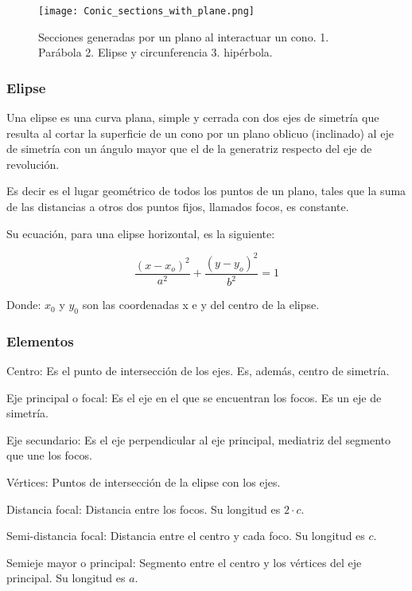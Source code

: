     \begin{figure}[htb]
 		\centering
		\texttt{[image: Conic\_sections\_with\_plane.png]}
        \caption{Secciones generadas por un plano al interactuar un cono.
        \vspace*{0.5cm}
        1. Parábola 2. Elipse y circunferencia 3. hipérbola.}
		\label{secciones}
	\end{figure}


    \subsubsection*{Elipse} \label{Elipse}


    Una elipse es una curva plana, simple y cerrada con dos ejes de
    simetría que resulta al cortar la superficie de un cono por un plano
    oblicuo (inclinado) al eje de simetría con un ángulo mayor que el de la
    generatriz respecto del eje de revolución.

    Es decir es el lugar geométrico de todos los puntos de un plano, tales que
    la suma de las distancias a otros dos puntos fijos, llamados focos, es
    constante.

    Su ecuación, para una elipse horizontal,  es la siguiente:


    $$ \frac{(x-x_o)^2}{a^2} + \frac{(y-y_o)^2}{b^2} = 1 $$

    Donde: $x_0$ y $y_0$ son las coordenadas x e y del centro de la elipse.


    \subsubsection*{Elementos} \label{Elementos}

    Centro: Es el punto de intersección de los ejes. Es, además, centro de
    simetría.

    Eje principal o focal: Es el eje en el que se encuentran los focos. Es un
    eje de simetría.

    Eje secundario: Es el eje perpendicular al eje principal, mediatriz del
    segmento que une los focos.

    Vértices: Puntos de intersección de la elipse con los ejes.

    Distancia focal: Distancia entre los focos. Su longitud es $2\cdot c$.

    Semi-distancia focal: Distancia entre el centro y cada foco. Su longitud es
    $c$.

    Semieje mayor o principal: Segmento entre el centro y los vértices del eje
    principal. Su longitud es $a$.

